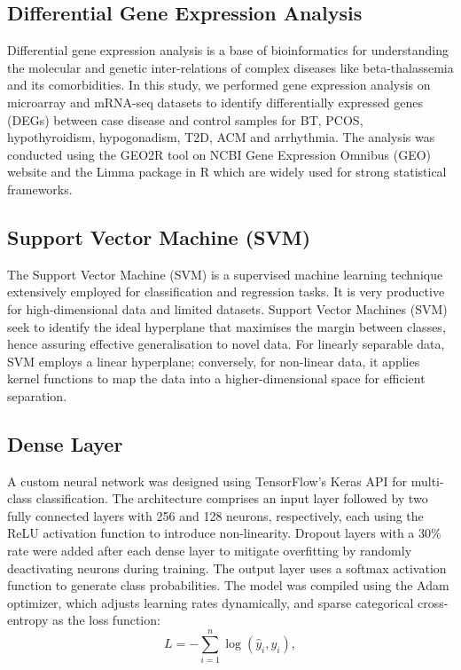 \newpage
\subsection{Differential Gene Expression Analysis}
\label{sec:sec3_4_2}
Differential gene expression analysis is a base of bioinformatics for understanding the molecular and genetic inter-relations of complex diseases like beta-thalassemia and its comorbidities. In this study, we performed gene expression analysis on microarray and mRNA-seq datasets to identify differentially expressed genes (DEGs) between case disease and control samples for BT, PCOS, hypothyroidism, hypogonadism, T2D, ACM and arrhythmia. The analysis was conducted using the GEO2R tool on NCBI Gene Expression Omnibus (GEO) website and the Limma package in R which are widely used for strong statistical frameworks.


\subsection{Support Vector Machine (SVM)}
\label{sec:sec3_3_2}
The Support Vector Machine (SVM) is a supervised machine learning technique extensively employed for classification and regression tasks. It is very productive for high-dimensional data and limited datasets. Support Vector Machines (SVM) seek to identify the ideal hyperplane that maximises the margin between classes, hence assuring effective generalisation to novel data. For linearly separable data, SVM employs a linear hyperplane; conversely, for non-linear data, it applies kernel functions to map the data into a higher-dimensional space for efficient separation.

\subsection{Dense Layer}
\label{sec:sec3_3_3}
A custom neural network was designed using TensorFlow's Keras API for multi-class classification. The architecture comprises an input layer followed by two fully connected layers with 256 and 128 neurons, respectively, each using the ReLU activation function to introduce non-linearity. Dropout layers with a 30\% rate were added after each dense layer to mitigate overfitting by randomly deactivating neurons during training. The output layer uses a softmax activation function to generate class probabilities. The model was compiled using the Adam optimizer, which adjusts learning rates dynamically, and sparse categorical cross-entropy as the loss function:
\[
L = -\sum_{i=1}^{n} \log(\hat{y}_i, y_i),
\]

